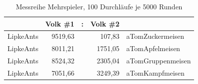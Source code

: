 \begin{table}[hbt]
\centering
\begin{minipage}[t]{.7\textwidth} %
\caption{Messreihe Mehrspieler, 100 Durchläufe je 5000 Runden} %
\begin{tabularx}{\columnwidth}{lrcrl}
\toprule
 & Volk \#1 & : & Volk \#2 & \\
\midrule
LipkeAnts & 9519,63 && 107,83 & aTomZuckermeisen\\
LipkeAnts & 8011,21 && 1751,05 & aTomApfelmeisen\\
LipkeAnts & 8524,32 && 2305,04 & aTomGruppenmeisen\\
LipkeAnts & 7051,66 && 3249,39 & aTomKampfmeisen\\
\bottomrule
\end{tabularx}
\label{tab:multiPlayer}
\end{minipage}
\end{table}
